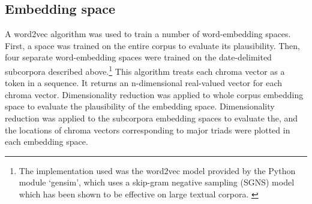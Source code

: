 \subsection{Embedding space}\label{embedding-space}

A word2vec algorithm was used to train a number of word-embedding
spaces. First, a space was trained on the entire corpus to evaluate its plausibility. Then, four separate word-embedding spaces were trained on the date-delimited subcorpora described above.\footnote{The implementation used was the word2vec model provided by the Python module `gensim', which uses a skip-gram negative sampling (SGNS) model which has been shown to be effective on large textual corpora. \cite{rehurek_lrec}}
This algorithm treats each chroma vector as a token in a sequence. It
returns an n-dimensional real-valued vector for each chroma vector. Dimensionality reduction was applied to whole corpus embedding space to evaluate the plausibility of the embedding space. Dimensionality reduction was applied to the subcorpora embedding spaces to evaluate the, and the locations of chroma vectors corresponding to major triads were plotted in each embedding space.